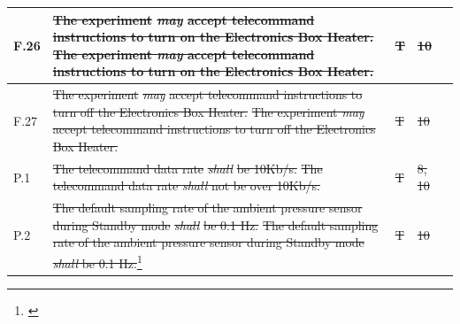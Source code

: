 \documentclass[a4paper,12pt,twoside]{article}
\providecommand{\DIFaddtex}[1]{{\protect\color{blue}\uwave{#1}}} %
\providecommand{\DIFdeltex}[1]{{\protect\color{red}\sout{#1}}}                      %
\providecommand{\DIFaddbegin}{} %
\providecommand{\DIFaddend}{} %
\providecommand{\DIFdelbegin}{} %
\providecommand{\DIFdelend}{} %
\providecommand{\DIFadd}[1]{\texorpdfstring{\DIFaddtex{#1}}{#1}} %
\providecommand{\DIFdel}[1]{\texorpdfstring{\DIFdeltex{#1}}{}} %
\newcommand{\DIFscaledelfig}{0.5}
\newlength{\DIFdelgraphicswidth} %
\newlength{\DIFdelgraphicsheight} %
\newcommand{\DIFaddincludegraphics}[2][]{{\color{blue}\fbox{\DIFOincludegraphics[#1]{#2}}}} %
\newcommand{\DIFdelincludegraphics}[2][]{%
\sbox{\DIFdelgraphicsbox}{\DIFOincludegraphics[#1]{#2}}%
\settoboxwidth{\DIFdelgraphicswidth}{\DIFdelgraphicsbox} %
\settoboxtotalheight{\DIFdelgraphicsheight}{\DIFdelgraphicsbox} %
\scalebox{\DIFscaledelfig}{%
\parbox[b]{\DIFdelgraphicswidth}{\usebox{\DIFdelgraphicsbox}\\[-\baselineskip] \rule{\DIFdelgraphicswidth}{0em}}\llap{\resizebox{\DIFdelgraphicswidth}{\DIFdelgraphicsheight}{%
\setlength{\unitlength}{\DIFdelgraphicswidth}%
\begin{picture}(1,1)%
\thicklines\linethickness{2pt} %
{\color[rgb]{1,0,0}\put(0,0){\framebox(1,1){}}}%
{\color[rgb]{1,0,0}\put(0,0){\line( 1,1){1}}}%
{\color[rgb]{1,0,0}\put(0,1){\line(1,-1){1}}}%
\end{picture}%
}\hspace*{3pt}}} %
} %
\DeclareRobustCommand{\DIFaddbegin}{\DIFOaddbegin \let\includegraphics\DIFaddincludegraphics} %
\DeclareRobustCommand{\DIFaddend}{\DIFOaddend \let\includegraphics\DIFOincludegraphics} %
\DeclareRobustCommand{\DIFdelbegin}{\DIFOdelbegin \let\includegraphics\DIFdelincludegraphics} %
\DeclareRobustCommand{\DIFdelend}{\DIFOaddend \let\includegraphics\DIFOincludegraphics} %
\begin{document}
\begin{longtable}[]{|m{}| m{} |m{} |m{}|m{}|}
F.26 & \DIFdelbegin \DIFdel{The experiment }\textit{\DIFdel{may}} %
\DIFdel{accept telecommand instructions to turn on the Electronics Box Heater.                                                                                    }\DIFdelend \DIFaddbegin \st{The experiment \textit{may} accept telecommand instructions to turn on the Electronics Box Heater.}\DIFadd{\textsuperscript{\ref{fn:unnecessary-requirement}}                                                                                     }\DIFaddend &      \DIFdelbegin \DIFdel{T        }\DIFdelend \DIFaddbegin \DIFadd{-        }\DIFaddend & \DIFdelbegin \DIFdel{10            }\DIFdelend \DIFaddbegin \DIFadd{-            }\DIFaddend &        \\ \hline
F.27 & \DIFdelbegin \DIFdel{The experiment }\textit{\DIFdel{may}} %
\DIFdel{accept telecommand instructions to turn off the Electronics Box Heater.                                                                                   }\DIFdelend \DIFaddbegin \st{The experiment \textit{may} accept telecommand instructions to turn off the Electronics Box Heater.}\DIFadd{\textsuperscript{\ref{fn:unnecessary-requirement}}                                                                                    }\DIFaddend &      \DIFdelbegin \DIFdel{T        }\DIFdelend \DIFaddbegin \DIFadd{-        }\DIFaddend & \DIFdelbegin \DIFdel{10            }\DIFdelend \DIFaddbegin \DIFadd{-            }\DIFaddend &        \\ \hline
P.1  & \DIFdelbegin \DIFdel{The telecommand data rate }\textit{\DIFdel{shall}} %
\DIFdel{be 10Kb/s.                                                                                                                          }\DIFdelend \DIFaddbegin \st{The telecommand data rate \textit{shall} not be over 10Kb/s.}\DIFadd{\textsuperscript{\ref{fn:design-requirement}}                                                                                                                           }\DIFaddend &        \DIFdelbegin \DIFdel{T      }\DIFdelend \DIFaddbegin \DIFadd{-      }\DIFaddend & \DIFdelbegin \DIFdel{8, 10            }\DIFdelend \DIFaddbegin \DIFadd{-          }\DIFaddend &        \\ \hline
P.2  & \DIFdelbegin \DIFdel{The default sampling rate of the ambient pressure sensor during Standby mode }\textit{\DIFdel{shall}} %
\DIFdel{be 0.1 Hz.                                                                           }\DIFdelend \DIFaddbegin \st{The default sampling rate of the ambient pressure sensor during Standby mode \textit{shall} be 0.1 Hz.}\footnote{\DIFadd{Replaced by P.23}\label{replaceSoftVeri}}                                                                       \DIFaddend &      \DIFdelbegin \DIFdel{T        }\DIFdelend \DIFaddbegin \DIFadd{-  }\DIFaddend & \DIFdelbegin \DIFdel{10            }\DIFdelend \DIFaddbegin \DIFadd{-  }\DIFaddend &        \\ \hline

\end{longtable}
\end{document}
